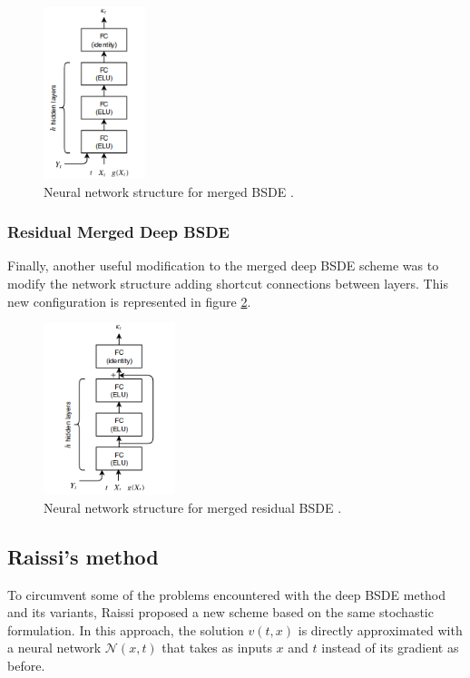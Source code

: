 \begin{figure}[H]
	\centering
	\includegraphics[width=0.4\linewidth,height=5cm]{images/MergedStructure}
	\caption{Neural network structure for merged BSDE \cite{chan-wai-nam_machine_2018}.}
	\label{fig:MergedStructure}
\end{figure}
\subsubsection*{Residual Merged Deep BSDE}
Finally, another useful modification to the merged deep BSDE scheme was to modify the network structure adding shortcut connections between layers. This new configuration is represented in figure \ref{fig:ResidualMergedStructure}.
\begin{figure}[H]
	\centering
	\includegraphics[width=0.4\linewidth,height=5cm]{images/ResidualMergedStructure}
	\caption{Neural network structure for merged residual BSDE \cite{chan-wai-nam_machine_2018}.}
	\label{fig:ResidualMergedStructure}
\end{figure}
\subsection{Raissi's method}
To circumvent some of the problems encountered with the deep BSDE method and its variants, Raissi \cite{raissi_forward-backward_2018} proposed a new scheme based on the same stochastic formulation. In this approach, the solution $v(t,x)$ is directly approximated with a neural network $\mathcal{N}(x,t)$ that takes as inputs $x$ and $t$ instead of its gradient as before. 

